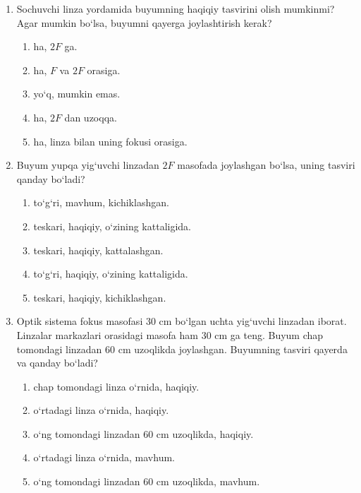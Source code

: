 \begin{enumerate}
\item Sochuvchi linza yordamida buyumning haqiqiy tasvirini olish mumkinmi? Agar mumkin bo‘lsa, buyumni qayerga joylashtirish kerak?

\begin{enumerate}[label=\Alph*)]
\item ha, $2F$ ga.
\item ha, $F$ va $2F$ orasiga.
\item yo‘q, mumkin emas.
\item ha, $2F$ dan uzoqqa.
\item ha, linza bilan uning fokusi orasiga.
\end{enumerate}

\item Buyum yupqa yig‘uvchi linzadan $2F$ masofada joylashgan bo‘lsa, uning tasviri qanday bo‘ladi?

\begin{enumerate}[label=\Alph*)]
\item to‘g‘ri, mavhum, kichiklashgan.
\item teskari, haqiqiy, o‘zining kattaligida.
\item teskari, haqiqiy, kattalashgan.
\item to‘g‘ri, haqiqiy, o‘zining kattaligida.
\item teskari, haqiqiy, kichiklashgan.
\end{enumerate}

\item Optik sistema fokus masofasi 30 cm bo‘lgan uchta yig‘uvchi linzadan iborat. Linzalar markazlari orasidagi masofa ham 30 cm ga teng. Buyum chap tomondagi linzadan 60 cm uzoqlikda joylashgan. Buyumning tasviri qayerda va qanday bo‘ladi?


\begin{enumerate}[label=\Alph*)]
\item chap tomondagi linza o‘rnida, haqiqiy.
\item o‘rtadagi linza o‘rnida, haqiqiy.
\item o‘ng tomondagi linzadan 60 cm uzoqlikda, haqiqiy.
\item o‘rtadagi linza o‘rnida, mavhum.
\item o‘ng tomondagi linzadan 60 cm uzoqlikda, mavhum.
\end{enumerate}

\end{enumerate}




